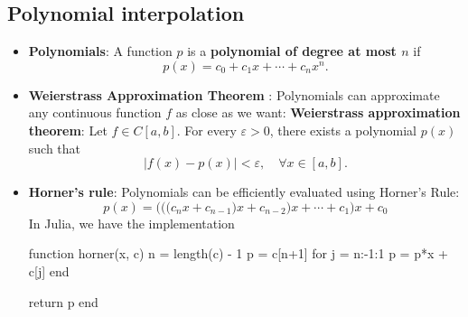 \documentclass{report}
\begin{document}
    \subsection{Polynomial interpolation}
    \begin{itemize}
        \item \textbf{Polynomials}: A function $p$ is a \textbf{polynomial of degree at most $n$} if
            $$p(x) = c_0 + c_1 x + \cdots + c_n x^n.$$
            \bigbreak \noindent 

        \item \textbf{Weierstrass Approximation Theorem }:  Polynomials can approximate any continuous function $f$ as close as we want:
            \bigbreak \noindent 
            \textbf{Weierstrass approximation theorem}:
            Let $f \in C[a,b]$. For every $\varepsilon > 0$, there exists a polynomial $p(x)$ such that
            $$\left|f(x) - p(x)\right| < \varepsilon, \quad \forall x \in [a,b].$$
        \item \textbf{Horner's rule}:
            Polynomials can be efficiently evaluated using Horner's Rule:
          $$p(x) = \bigg( \Big( \big(c_n x + c_{n-1}\big)x + c_{n-2} \Big)x + \cdots + c_1\bigg)x + c_0$$
          \bigbreak \noindent 
          In Julia, we have the implementation
          \bigbreak \noindent 
          \begin{cppcode}
              function horner(x, c)
                  n = length(c) - 1
                  p = c[n+1]
                  for j = n:-1:1
                      p = p*x + c[j]
                  end

                  return p
              end
          \end{cppcode}


\end{itemize}
\end{document}
